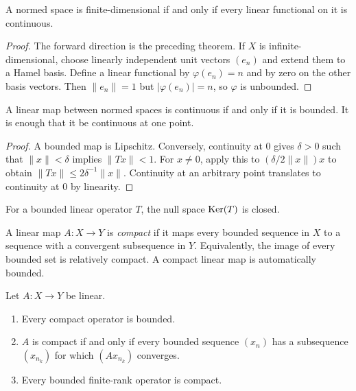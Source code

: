 \begin{notetheorem}
A normed space is finite-dimensional if and only if every linear functional
on it is continuous.
\end{notetheorem}

\begin{proof}
The forward direction is the preceding theorem.  If $X$ is
infinite-dimensional, choose linearly independent unit vectors $(e_n)$ and
extend them to a Hamel basis.  Define a linear functional by
$\varphi(e_n)=n$ and by zero on the other basis vectors.  Then
$\|e_n\|=1$ but $|\varphi(e_n)|=n$, so $\varphi$ is unbounded.
\end{proof}

\begin{notetheorem}
A linear map between normed spaces is continuous if and only if it is bounded.
It is enough that it be continuous at one point.
\end{notetheorem}

\begin{proof}
A bounded map is Lipschitz.  Conversely, continuity at $0$ gives
$\delta>0$ such that $\|x\|<\delta$ implies $\|Tx\|<1$.
For $x\ne0$, apply this to $(\delta/2\|x\|)x$ to obtain
$\|Tx\|\le2\delta^{-1}\|x\|$.  Continuity at an arbitrary point translates
to continuity at $0$ by linearity.
\end{proof}

\begin{notecorollary}
For a bounded linear operator $T$, the null space $\operatorname{Ker}(T)$ is closed.
\end{notecorollary}

\begin{notedefinition}
A linear map $A\colon X\to Y$ is \emph{compact} if it maps every bounded
sequence in $X$ to a sequence with a convergent subsequence in $Y$.
Equivalently, the image of every bounded set is relatively compact.  A compact
linear map is automatically bounded.
\end{notedefinition}

\begin{notetheorem}
Let $A\colon X\to Y$ be linear.
\begin{enumerate}
  \item Every compact operator is bounded.
  \item $A$ is compact if and only if every bounded sequence $(x_n)$ has a
        subsequence $(x_{n_k})$ for which $(Ax_{n_k})$ converges.
  \item Every bounded finite-rank operator is compact.
\end{enumerate}
\end{notetheorem}

